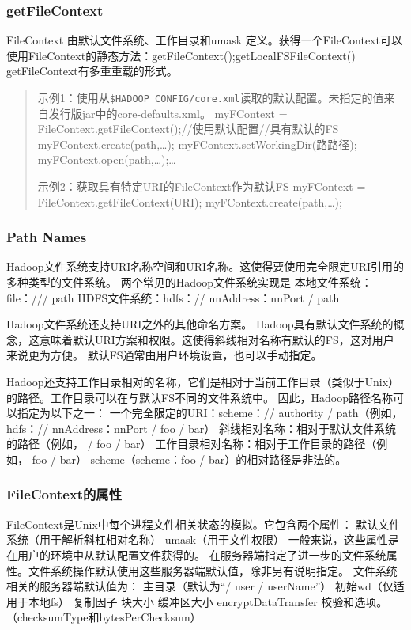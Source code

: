 \subsubsection{getFileContext}
FileContext 由默认文件系统、工作目录和umask 定义。获得一个FileContext可以使用FileContext的静态方法：getFileContext();getLocalFSFileContext()
getFileContext有多重重载的形式。
\begin{quote}
示例1：使用从\verb|$HADOOP_CONFIG/core.xml|读取的默认配置。未指定的值来自发行版jar中的core-defaults.xml。
myFContext = FileContext.getFileContext();//使用默认配置//具有默认的FS
myFContext.create(path,…);
myFContext.setWorkingDir(路路径);
myFContext.open(path,…);…


示例2：获取具有特定URI的FileContext作为默认FS
myFContext = FileContext.getFileContext(URI);
myFContext.create(path,…);
\end{quote}

\subsubsection{Path Names}
Hadoop文件系统支持URI名称空间和URI名称。这使得要使用完全限定URI引用的多种类型的文件系统。
两个常见的Hadoop文件系统实现是
本地文件系统：file：/// path
HDFS文件系统：hdfs：// nnAddress：nnPort / path

Hadoop文件系统还支持URI之外的其他命名方案。
Hadoop具有默认文件系统的概念，这意味着默认URI方案和权限。这使得斜线相对名称有默认的FS，这对用户来说更为方便。
默认FS通常由用户环境设置，也可以手动指定。

Hadoop还支持工作目录相对的名称，它们是相对于当前工作目录（类似于Unix）的路径。工作目录可以在与默认FS不同的文件系统中。
因此，Hadoop路径名称可以指定为以下之一：
一个完全限定的URI：scheme：// authority / path（例如， hdfs：// nnAddress：nnPort / foo / bar）
斜线相对名称：相对于默认文件系统的路径（例如， / foo / bar）
工作目录相对名称：相对于工作目录的路径（例如， foo / bar）
scheme（scheme：foo / bar）的相对路径是非法的。

\subsubsection{FileContext的属性}
FileContext是Unix中每个进程文件相关状态的模拟。它包含两个属性：
默认文件系统（用于解析斜杠相对名称）
umask（用于文件权限）
一般来说，这些属性是在用户的环境中从默认配置文件获得的。
在服务器端指定了进一步的文件系统属性。文件系统操作默认使用这些服务器端默认值，除非另有说明指定。
文件系统相关的服务器端默认值为：
主目录（默认为“/ user / userName”）
初始wd（仅适用于本地fs）
复制因子
块大小
缓冲区大小
encryptDataTransfer
校验和选项。 （checksumType和bytesPerChecksum）

